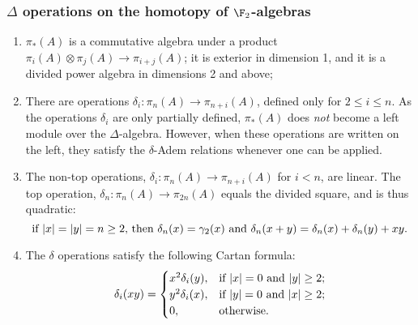 \documentclass[10pt]{article}
\begin{document}
\begin{SteenrodAlgebrasAndTheirKoszulDuals}
\subsubsection{$\Delta$ operations on the homotopy of $\F_2$-algebras}
\begin{enumerate}\squishlist
\setlength{\parindent}{.25in}
\item $\pi_*(A)$ is a commutative algebra under a product $\pi_i(A)\otimes \pi_j(A)\to \pi_{i+j}(A)$; it is exterior in dimension 1, and it is a divided power algebra in dimensions 2 and above;
\item There are operations $\delta_i:\pi_n(A)\to \pi_{n+i}(A)$, defined only for $2\leq i\leq n$. 
As the operations $\delta_i$ are only partially defined, $\pi_*(A)$ does \emph{not} become a left module over the $\Delta$-algebra.
 However, when these operations are written on the left, they satisfy the $\delta$-Adem relations whenever one can be applied.
\item The non-top operations, $\delta_i:\pi_n(A)\to \pi_{n+i}(A)$ for $i<n$, are linear. The top operation, $\delta_n:\pi_n(A)\to \pi_{2n}(A)$ equals the divided square, and is thus quadratic:
\[\textup{if $|x|=|y|=n\geq2$, then }\delta_n(x)=\gamma_2(x)\textup{ and }\delta_n(x+y)=\delta_n(x)+\delta_n(y)+xy.\]
\item The $\delta$ operations satisfy the following Cartan formula:
\[\delta_i(xy)=\begin{cases}
x^2\delta_i(y),&\textup{if }|x|=0\textup{ and }|y|\geq2;\\
y^2\delta_i(x),&\textup{if }|y|=0\textup{ and }|x|\geq2;\\
0,&\textup{otherwise}.
\end{cases}
\]
\end{enumerate}

\end{SteenrodAlgebrasAndTheirKoszulDuals}
\end{document}

